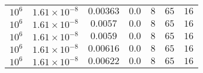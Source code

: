 \begin{tabular}{l c c c c c c}
$10^6$  &  $1.61 \times 10^{-8}$  &  $0.00363$  &  $0.0$  &  $8$  &  $65$  &  $16$ \\ 
$10^6$  &  $1.61 \times 10^{-8}$  &  $0.0057$  &  $0.0$  &  $8$  &  $65$  &  $16$ \\ 
$10^6$  &  $1.61 \times 10^{-8}$  &  $0.0059$  &  $0.0$  &  $8$  &  $65$  &  $16$ \\ 
$10^6$  &  $1.61 \times 10^{-8}$  &  $0.00616$  &  $0.0$  &  $8$  &  $65$  &  $16$ \\ 
$10^6$  &  $1.61 \times 10^{-8}$  &  $0.00622$  &  $0.0$  &  $8$  &  $65$  &  $16$ \\ 
\hline \hline
\end{tabular}
